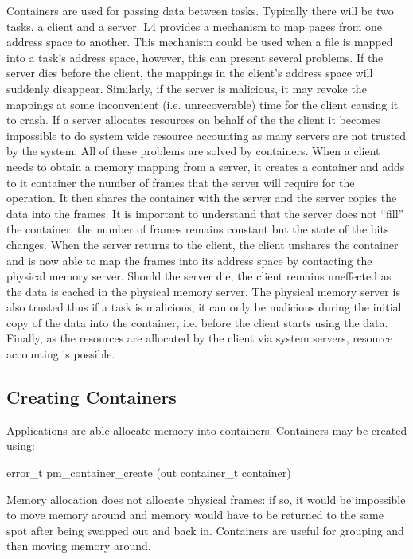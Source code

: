 Containers are used for passing data between tasks.  Typically there
will be two tasks, a client and a server.  L4 provides a mechanism to
map pages from one address space to another.  This mechanism could be
used when a file is mapped into a task's address space, however, this
can present several problems.  If the server dies before the client,
the mappings in the client's address space will suddenly disappear.
Similarly, if the server is malicious, it may revoke the mappings at
some inconvenient (i.e. unrecoverable) time for the client causing it
to crash.  If a server allocates resources on behalf of the the client
it becomes impossible to do system wide resource accounting as many
servers are not trusted by the system.  All of these problems are
solved by containers.  When a client needs to obtain a memory mapping
from a server, it creates a container and adds to it container the
number of frames that the server will require for the operation.  It
then shares the container with the server and the server copies the
data into the frames.  It is important to understand that the server
does not ``fill'' the container: the number of frames remains constant
but the state of the bits changes.  When the server returns to the
client, the client unshares the container and is now able to map the
frames into its address space by contacting the physical memory
server.  Should the server die, the client remains uneffected as the
data is cached in the physical memory server.  The physical memory
server is also trusted thus if a task is malicious, it can only be
malicious during the initial copy of the data into the container,
i.e. before the client starts using the data.  Finally, as the
resources are allocated by the client via system servers, resource
accounting is possible.

\subsection{Creating Containers}

Applications are able allocate memory into containers.  Containers may
be created using:

\begin{code}
error\_t pm\_container\_create (out container\_t container)
\end{code}

Memory allocation does not allocate physical frames: if so, it would
be impossible to move memory around and memory would have to be
returned to the same spot after being swapped out and back in.
Containers are useful for grouping and then moving memory around.

